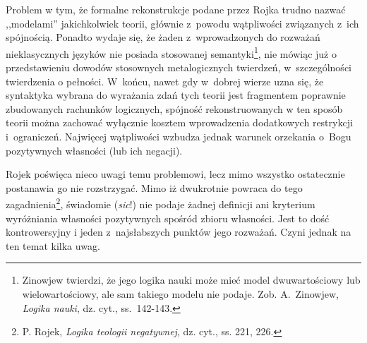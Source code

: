 Problem w tym, że formalne rekonstrukcje podane przez Rojka trudno nazwać
,,modelami'' jakichkolwiek teorii, głównie z~powodu wątpliwości
związanych z~ich spójnością. Ponadto wydaje się, że żaden z~wprowadzonych do
rozważań nieklasycznych języków nie posiada stosowanej semantyki\footnote{Zinowjew twierdzi, że jego
logika nauki może mieć model dwuwartościowy lub wielowartościowy, ale sam takiego modelu nie podaje. Zob.
A.~Zinowjew, \textit{Logika nauki}, dz. cyt., ss.~142-143.},
nie mówiąc już o przedstawieniu dowodów stosownych metalogicznych twierdzeń,
w~szczególności twierdzenia o pełności.
W~końcu, nawet gdy w~dobrej wierze uzna się, że syntaktyka wybrana do wyrażania
zdań tych teorii jest  fragmentem poprawnie zbudowanych rachunków logicznych,
spójność rekonstruowanych w ten sposób teorii można zachować wyłącznie kosztem wprowadzenia dodatkowych restrykcji
i~ograniczeń. Najwięcej wątpliwości wzbudza jednak
warunek orzekania o~Bogu pozytywnych
własności (lub ich negacji).




Rojek poświęca nieco uwagi temu problemowi, lecz mimo wszystko ostatecznie
postanawia go nie rozstrzygać.
Mimo iż dwukrotnie powraca do tego zagadnienia\footnote{P. Rojek, \textit{Logika teologii negatywnej}, dz. cyt.,
ss. 221, 226. }, świadomie (\textit{sic}!) nie podaje żadnej definicji
ani kryterium wyróżniania własności pozytywnych spośród zbioru
własności. Jest to dość kontrowersyjny i jeden z~najsłabszych
punktów jego rozważań.
Czyni jednak na ten temat kilka uwag.




